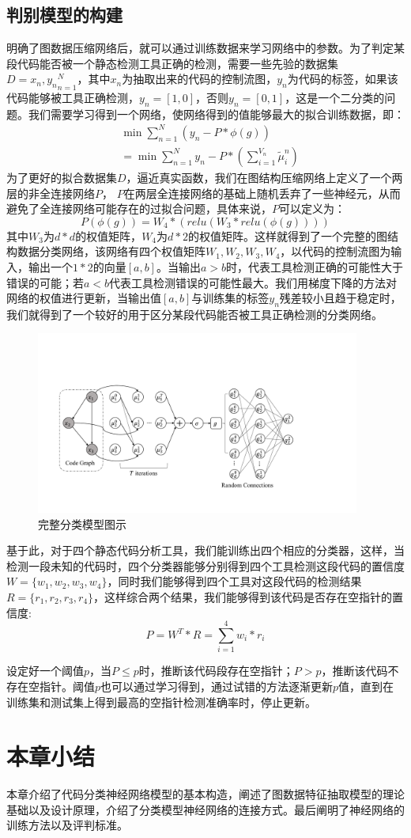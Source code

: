 \subsection{判别模型的构建}
明确了图数据压缩网络后，就可以通过训练数据来学习网络中的参数。为了判定某段代码能否被一个静态检测工具正确的检测，需要一些先验的数据集 $D={x_n, y_n}_{n=1}^N$，其中$x_n$为抽取出来的代码的控制流图，$y_n$为代码的标签，如果该代码能够被工具正确检测，$y_n=[1, 0]$，否则$y_n=[0, 1]$，这是一个二分类的问题。我们需要学习得到一个网络，使网络得到的值能够最大的拟合训练数据，即：
\begin{align}
&\min \sum_{n=1}^{N} (y_n - P*\phi(g))\\
&=\min \sum_{n=1}^{N} y_n - P*(\sum_{i=1}^{V_n} \tilde{\mu}_i^n)
\end{align}
为了更好的拟合数据集$D$，逼近真实函数，我们在图结构压缩网络上定义了一个两层的非全连接网络$P$， $P$在两层全连接网络的基础上随机丢弃了一些神经元，从而避免了全连接网络可能存在的过拟合问题，具体来说，$P$可以定义为：
\begin{equation}
P(\phi(g)) = W_4*(relu(W_3*relu(\phi(g))))
\end{equation}
其中$W_3$为$d*d$的权值矩阵，$W_4$为$d*2$的权值矩阵。这样就得到了一个完整的图结构数据分类网络，该网络有四个权值矩阵$W_1, W_2, W_3, W_4$，以代码的控制流图为输入，输出一个$1*2$的向量$[a, b]$。当输出$a>b$时，代表工具检测正确的可能性大于错误的可能；若$a<b$代表工具检测错误的可能性最大。我们用梯度下降的方法对网络的权值进行更新，当输出值$[a, b]$与训练集的标签$y_n$残差较小且趋于稳定时，我们就得到了一个较好的用于区分某段代码能否被工具正确检测的分类网络。
\begin{figure}[htbp]
	\begin{center}
		\includegraphics[width=0.95\textwidth]{figures//6.pdf}
		\caption{完整分类模型图示}
		\label{default}
	\end{center}
\end{figure}
\par 基于此，对于四个静态代码分析工具，我们能训练出四个相应的分类器，这样，当检测一段未知的代码时，四个分类器能够分别得到四个工具检测这段代码的置信度$W = \{w_1, w_2, w_3, w_4\}$，同时我们能够得到四个工具对这段代码的检测结果$R = \{r_1, r_2, r_3, r_4\}$，这样综合两个结果，我们能够得到该代码是否存在空指针的置信度:
$$P = W^T*R = \sum_{i=1}^4 w_i*r_i$$
\par 设定好一个阈值$p$，当$P\le p$时，推断该代码段存在空指针；$P>p$，推断该代码不存在空指针。阈值$p$也可以通过学习得到，通过试错的方法逐渐更新$p$值，直到在训练集和测试集上得到最高的空指针检测准确率时，停止更新。
\section{本章小结}
本章介绍了代码分类神经网络模型的基本构造，阐述了图数据特征抽取模型的理论基础以及设计原理，介绍了分类模型神经网络的连接方式。最后阐明了神经网络的训练方法以及评判标准。
